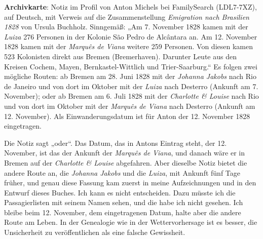 \documentclass[
  ngerman,
  11pt,
  openany]{book}
\begin{document}
\begin{ficha}

\textbf{Archivkarte}: Notiz im Profil von Anton Michels bei FamilySearch
(LDL7-7XZ), auf Deutsch, mit Verweis auf die Zusammenstellung
\emph{Emigration nach Brasilien 1828} von Ursula Buchholz. Sinngemäß:
„Am 7. November 1828 kamen mit der \emph{Luiza} 276 Personen in der
Kolonie São Pedro de Alcântara an. Am 12. November 1828 kamen mit der
\emph{Marquês de Viana} weitere 259 Personen. Von diesen kamen 523
Kolonisten direkt aus Bremen (Bremerhaven). Darunter Leute aus den
Kreisen Cochem, Mayen, Bernkastel-Wittlich und Trier-Saarburg.`` Es
folgen zwei mögliche Routen: ab Bremen am 28. Juni 1828 mit der
\emph{Johanna Jakobs} nach Rio de Janeiro und von dort im Oktober mit
der \emph{Luiza} nach Desterro (Ankunft am 7. November); oder ab Bremen
am 6. Juli 1828 mit der \emph{Charlotte \& Louise} nach Rio und von dort
im Oktober mit der \emph{Marquês de Viana} nach Desterro (Ankunft am 12.
November). Als Einwanderungsdatum ist für Anton der 12. November 1828
eingetragen.

\end{ficha}

Die Notiz sagt „oder``. Das Datum, das in Antons Eintrag steht, der 12.
November, ist das der Ankunft der \emph{Marquês de Viana}, und danach
wäre er in Bremen auf der \emph{Charlotte \& Louise} abgefahren. Aber
dieselbe Notiz bietet die andere Route an, die \emph{Johanna Jakobs} und
die \emph{Luiza}, mit Ankunft fünf Tage früher, und genau diese Fassung
kam zuerst in meine Aufzeichnungen und in den Entwurf dieses Buches. Ich
kann es nicht entscheiden. Dazu müsste ich die Passagierlisten mit
seinem Namen sehen, und die habe ich nicht gesehen. Ich bleibe beim 12.
November, dem eingetragenen Datum, halte aber die andere Route am Leben.
In der Genealogie wie in der Wettervorhersage ist es besser, die
Unsicherheit zu veröffentlichen als eine falsche Gewissheit.
\end{document}
